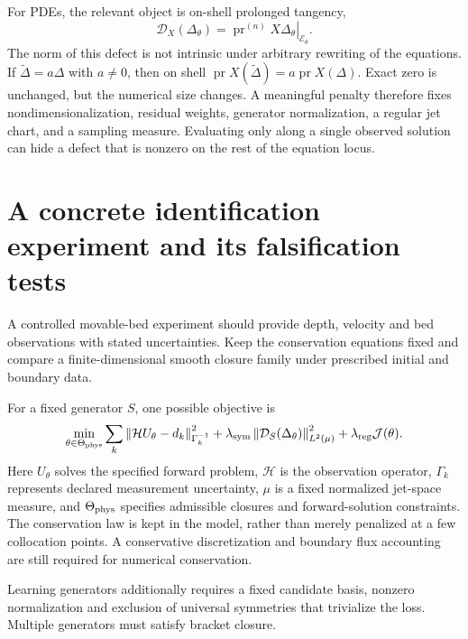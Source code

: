 \documentclass[11pt,a4paper,oneside]{report}
\numberwithin{equation}{chapter}
\newcommand{\E}{\mathcal E}
\newcommand{\pr}{\operatorname{pr}}
\newcommand{\norm}[1]{\left\lVert#1\right\rVert}
\begin{document}
For PDEs, the relevant object is on-shell prolonged tangency,
\begin{equation}\label{eq:defectmodel}
\mathcal D_X(\Delta_\theta)=\left.\pr^{(n)}X\Delta_\theta\right|_{\E_\theta}.
\end{equation}
The norm of this defect is not intrinsic under arbitrary rewriting of the equations. If $\widetilde\Delta=a\Delta$ with $a\ne0$, then on shell $\pr X(\widetilde\Delta)=a\pr X(\Delta)$. Exact zero is unchanged, but the numerical size changes. A meaningful penalty therefore fixes nondimensionalization, residual weights, generator normalization, a regular jet chart, and a sampling measure. Evaluating only along a single observed solution can hide a defect that is nonzero on the rest of the equation locus.

\section{A concrete identification experiment and its falsification tests}
A controlled movable-bed experiment should provide depth, velocity and bed observations with stated uncertainties. Keep the conservation equations fixed and compare a finite-dimensional smooth closure family under prescribed initial and boundary data.

For a fixed generator $S$, one possible objective is
\begin{equation}\label{eq:objective}
\min_{\theta\in\Theta_{\rm phys}}
\sum_{k}\norm{\mathcal H U_\theta-d_k}_{\Gamma_k^{-1}}^2
+\lambda_{\rm sym}\norm{\mathcal D_S(\Delta_\theta)}_{L^2(\mu)}^2
+\lambda_{\rm reg}\mathcal J(\theta).
\end{equation}
Here $U_\theta$ solves the specified forward problem, $\mathcal H$ is the observation operator, $\Gamma_k$ represents declared measurement uncertainty, $\mu$ is a fixed normalized jet-space measure, and $\Theta_{\rm phys}$ specifies admissible closures and forward-solution constraints. The conservation law is kept in the model, rather than merely penalized at a few collocation points. A conservative discretization and boundary flux accounting are still required for numerical conservation.

Learning generators additionally requires a fixed candidate basis, nonzero normalization and exclusion of universal symmetries that trivialize the loss. Multiple generators must satisfy bracket closure.
\end{document}
